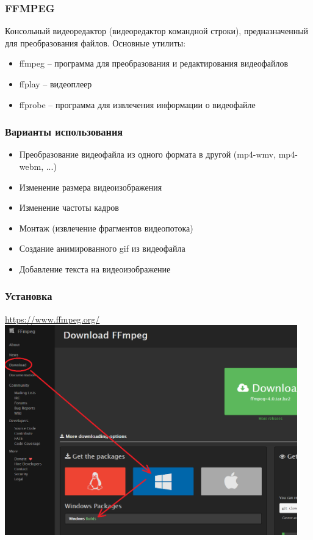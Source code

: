 \documentclass[11pt, compress]{beamer}
\renewcommand{\emph}[1]{\textcolor{dark-blue}{#1}}
\begin{document}
\begin{frame}[c, fragile]
\frametitle{FFMPEG}
Консольный видеоредактор (видеоредактор командной строки), предназначенный для преобразования файлов. Основные утилиты:
\begin{itemize}
\item \emph{ffmpeg} -- программа для преобразования и редактирования видеофайлов
\item \emph{ffplay} -- видеоплеер
\item \emph{ffprobe} -- программа для извлечения информации о видеофайле
\end{itemize}
\end{frame}

\begin{frame}[c, fragile]
\frametitle{Варианты использования}
\begin{itemize}
	\item Преобразование видеофайла из одного формата в другой (mp4-wmv, mp4-webm, ...)
	\item Изменение размера видеоизображения
	\item Изменение частоты кадров
	\item Монтаж (извлечение фрагментов видеопотока)
	\item Создание анимированного gif из видеофайла
	\item Добавление текста на видеоизображение
\end{itemize}
\end{frame}

\begin{frame}[t]
\frametitle{Установка}
\url{https://www.ffmpeg.org/}
\centering
\includegraphics[width=0.95\textwidth]{ffmpeg_install_1.png}
\end{frame}
\end{document}
